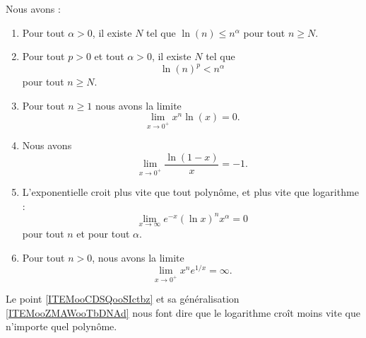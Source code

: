 \begin{proposition}     \label{PROPooKVIFooGdKpfP}
	Nous avons :
	\begin{enumerate}
		\item   \label{ITEMooCDSQooSIctbz}
		      Pour tout \( \alpha>0\), il existe \( N\) tel que \( \ln(n)\leq n^{\alpha}\) pour tout \( n\geq N\).
		\item       \label{ITEMooZMAWooTbDNAd}
		      Pour tout \( p>0\) et tout \( \alpha>0\), il existe \( N\) tel que
		      \begin{equation}
			      \ln(n)^p<n^{\alpha}
		      \end{equation}
		      pour tout \( n\geq N\).
		\item       \label{ITEMooBLNOooZQNTfd}
		      Pour tout \( n\geq 1\) nous avons la limite
		      \begin{equation}
			      \lim_{x\to 0^+} x^n\ln(x)=0.
		      \end{equation}
		\item       \label{ITEMooMLNMooAyJTox}
		      Nous avons
		      \begin{equation}
			      \lim_{x\to 0^+} \frac{ \ln(1-x) }{ x }=-1.
		      \end{equation}
		\item       \label{ITEMooIQEKooBionsK}
		      L'exponentielle croit plus vite que tout polynôme, et plus vite que logarithme :
		      \begin{equation}        \label{EqExpDecrtPlusVite}
			      \lim_{x\to\infty} e^{-x}(\ln x)^{n}x^{\alpha}=0
		      \end{equation}
		      pour tout \( n\) et pour tout \( \alpha\).
		\item       \label{ITEMooDUQWooNvAvmR}
		      Pour tout \( n>0\), nous avons la limite
		      \begin{equation}
			      \lim_{x\to 0^+} x^n e^{1/x}=\infty.
		      \end{equation}
	\end{enumerate}
\end{proposition}

Le point \ref{ITEMooCDSQooSIctbz} et sa généralisation \ref{ITEMooZMAWooTbDNAd} nous font dire que le logarithme croît moins vite que n'importe quel polynôme.

